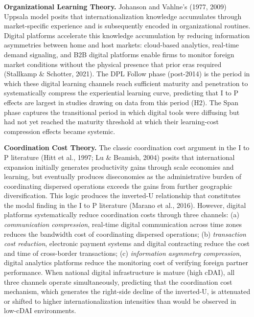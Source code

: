 \documentclass[
  12pt,a4paper]{article}
\begin{document}
\textbf{Organizational Learning Theory.} Johanson and Vahlne's (1977,
2009) Uppsala model posits that internationalization knowledge
accumulates through market-specific experience and is subsequently
encoded in organizational routines. Digital platforms accelerate this
knowledge accumulation by reducing information asymmetries between home
and host markets: cloud-based analytics, real-time demand signaling, and
B2B digital platforms enable firms to monitor foreign market conditions
without the physical presence that prior eras required (Stallkamp \&
Schotter, 2021). The DPL Follow phase (post-2014) is the period in which
these digital learning channels reach sufficient maturity and
penetration to systematically compress the experiential learning curve,
predicting that I to P effects are largest in studies drawing on data
from this period (H2). The Span phase captures the transitional period
in which digital tools were diffusing but had not yet reached the
maturity threshold at which their learning-cost compression effects
became systemic.

\textbf{Coordination Cost Theory.} The classic coordination cost
argument in the I to P literature (Hitt et al., 1997; Lu \& Beamish,
2004) posits that international expansion initially generates
productivity gains through scale economies and learning, but eventually
produces diseconomies as the administrative burden of coordinating
dispersed operations exceeds the gains from further geographic
diversification. This logic produces the inverted-U relationship that
constitutes the modal finding in the I to P literature (Marano et al.,
2016). However, digital platforms systematically reduce coordination
costs through three channels: (a) \emph{communication compression},
real-time digital communication across time zones reduces the bandwidth
cost of coordinating dispersed operations; (b) \emph{transaction cost
reduction}, electronic payment systems and digital contracting reduce
the cost and time of cross-border transactions; (c) \emph{information
asymmetry compression}, digital analytics platforms reduce the
monitoring cost of verifying foreign partner performance. When national
digital infrastructure is mature (high cDAI), all three channels operate
simultaneously, predicting that the coordination cost mechanism, which
generates the right-side decline of the inverted-U, is attenuated or
shifted to higher internationalization intensities than would be
observed in low-cDAI environments.
\end{document}
